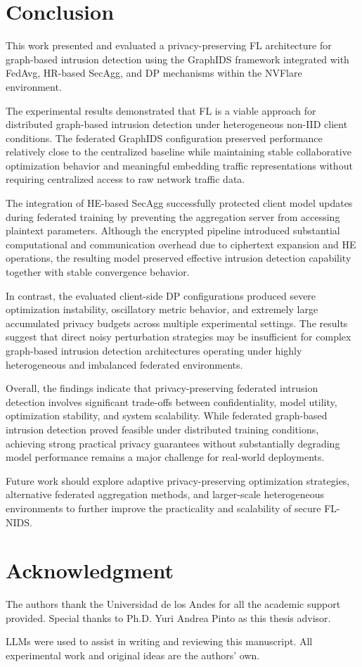 \documentclass[conference]{IEEEtran}
\begin{document}
\section{Conclusion}

This work presented and evaluated a privacy-preserving FL architecture for graph-based intrusion detection using the GraphIDS framework integrated with FedAvg, HR-based SecAgg, and DP mechanisms within the NVFlare environment.

The experimental results demonstrated that FL is a viable approach for distributed graph-based intrusion detection under heterogeneous non-IID client conditions. The federated GraphIDS configuration preserved performance relatively close to the centralized baseline while maintaining stable collaborative optimization behavior and meaningful embedding traffic representations without requiring centralized access to raw network traffic data.

The integration of HE-based SecAgg successfully protected client model updates during federated training by preventing the aggregation server from accessing plaintext parameters. Although the encrypted pipeline introduced substantial computational and communication overhead due to ciphertext expansion and HE operations, the resulting model preserved effective intrusion detection capability together with stable convergence behavior.

In contrast, the evaluated client-side DP configurations produced severe optimization instability, oscillatory metric behavior, and extremely large accumulated privacy budgets across multiple experimental settings. The results suggest that direct noisy perturbation strategies may be insufficient for complex graph-based intrusion detection architectures operating under highly heterogeneous and imbalanced federated environments.

Overall, the findings indicate that privacy-preserving federated intrusion detection involves significant trade-offs between confidentiality, model utility, optimization stability, and system scalability. While federated graph-based intrusion detection proved feasible under distributed training conditions, achieving strong practical privacy guarantees without substantially degrading model performance remains a major challenge for real-world deployments.

Future work should explore adaptive privacy-preserving optimization strategies, alternative federated aggregation methods, and larger-scale heterogeneous environments to further improve the practicality and scalability of secure FL-NIDS.

\section*{Acknowledgment}

The authors thank the Universidad de los Andes for  all the academic support provided. Special thanks to Ph.D. Yuri Andrea Pinto as this thesis advisor.

LLMs were used to assist in writing and reviewing this manuscript. All experimental work and original ideas are the authors' own.



\end{document}
